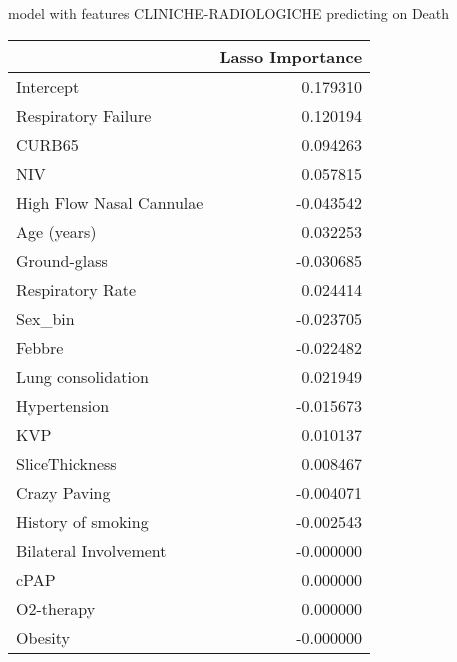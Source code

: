 model with features CLINICHE-RADIOLOGICHE predicting on Death\newline
\begin{tabular}{lr}
\toprule
{} &  Lasso Importance \\
\midrule
Intercept                &          0.179310 \\
Respiratory Failure      &          0.120194 \\
CURB65                   &          0.094263 \\
NIV                      &          0.057815 \\
High Flow Nasal Cannulae &         -0.043542 \\
Age (years)              &          0.032253 \\
Ground-glass             &         -0.030685 \\
Respiratory Rate         &          0.024414 \\
Sex\_bin                  &         -0.023705 \\
Febbre                   &         -0.022482 \\
Lung consolidation       &          0.021949 \\
Hypertension             &         -0.015673 \\
KVP                      &          0.010137 \\
SliceThickness           &          0.008467 \\
Crazy Paving             &         -0.004071 \\
History of smoking       &         -0.002543 \\
Bilateral Involvement    &         -0.000000 \\
cPAP                     &          0.000000 \\
O2-therapy               &          0.000000 \\
Obesity                  &         -0.000000 \\
\bottomrule
\end{tabular}

